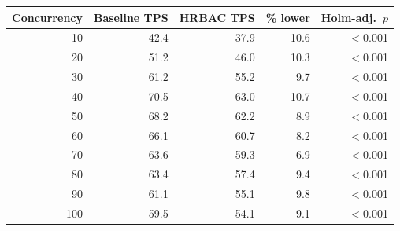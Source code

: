 \begin{tabular}{rrrrr}
\toprule
Concurrency & Baseline TPS & HRBAC TPS & \% lower & Holm-adj.\ $p$ \\
\midrule
10 & 42.4 & 37.9 & 10.6 & $<$0.001 \\
20 & 51.2 & 46.0 & 10.3 & $<$0.001 \\
30 & 61.2 & 55.2 & 9.7 & $<$0.001 \\
40 & 70.5 & 63.0 & 10.7 & $<$0.001 \\
50 & 68.2 & 62.2 & 8.9 & $<$0.001 \\
60 & 66.1 & 60.7 & 8.2 & $<$0.001 \\
70 & 63.6 & 59.3 & 6.9 & $<$0.001 \\
80 & 63.4 & 57.4 & 9.4 & $<$0.001 \\
90 & 61.1 & 55.1 & 9.8 & $<$0.001 \\
100 & 59.5 & 54.1 & 9.1 & $<$0.001 \\
\bottomrule
\end{tabular}